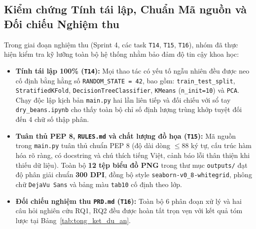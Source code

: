 \documentclass[a4paper,12pt]{report}
\begin{document}
\subsection{Kiểm chứng Tính tái lập, Chuẩn Mã nguồn và Đối chiếu Nghiệm thu}
Trong giai đoạn nghiệm thu (Sprint 4, các task \texttt{T14}, \texttt{T15}, \texttt{T16}), nhóm đã thực hiện kiểm tra kỹ lưỡng toàn bộ hệ thống nhằm bảo đảm độ tin cậy khoa học:
\begin{itemize}[leftmargin=*]
    \item \textbf{Tính tái lập 100\% (\texttt{T14}):} Mọi thao tác có yếu tố ngẫu nhiên đều được neo cố định bằng hằng số \texttt{RANDOM\_STATE = 42}, bao gồm: \texttt{train\_test\_split}, \texttt{StratifiedKFold}, \texttt{DecisionTreeClassifier}, \texttt{KMeans} (\texttt{n\_init=10}) và \texttt{PCA}. Chạy độc lập kịch bản \texttt{main.py} hai lần liên tiếp và đối chiếu với sổ tay \texttt{dry\_beans.ipynb} cho thấy toàn bộ chỉ số định lượng trùng khớp tuyệt đối đến 4 chữ số thập phân.
    \item \textbf{Tuân thủ PEP 8, \texttt{RULES.md} và chất lượng đồ họa (\texttt{T15}):} Mã nguồn trong \texttt{main.py} tuân thủ chuẩn PEP 8 (độ dài dòng $\le 88$ ký tự, cấu trúc hàm hóa rõ ràng, có docstring và chú thích tiếng Việt, cảnh báo lỗi thân thiện khi thiếu dữ liệu). Toàn bộ \textbf{12 tệp biểu đồ PNG} trong thư mục \texttt{outputs/} đạt độ phân giải chuẩn \textbf{300 DPI}, đồng bộ style \texttt{seaborn-v0\_8-whitegrid}, phông chữ \texttt{DejaVu Sans} và bảng màu \texttt{tab10} cố định theo lớp.
    \item \textbf{Đối chiếu nghiệm thu \texttt{PRD.md} (\texttt{T16}):} Toàn bộ 6 phân đoạn xử lý và hai câu hỏi nghiên cứu RQ1, RQ2 đều được hoàn tất trọn vẹn với kết quả tóm lược tại Bảng~\ref{tab:tong_ket_du_an}.
\end{itemize}
\end{document}
